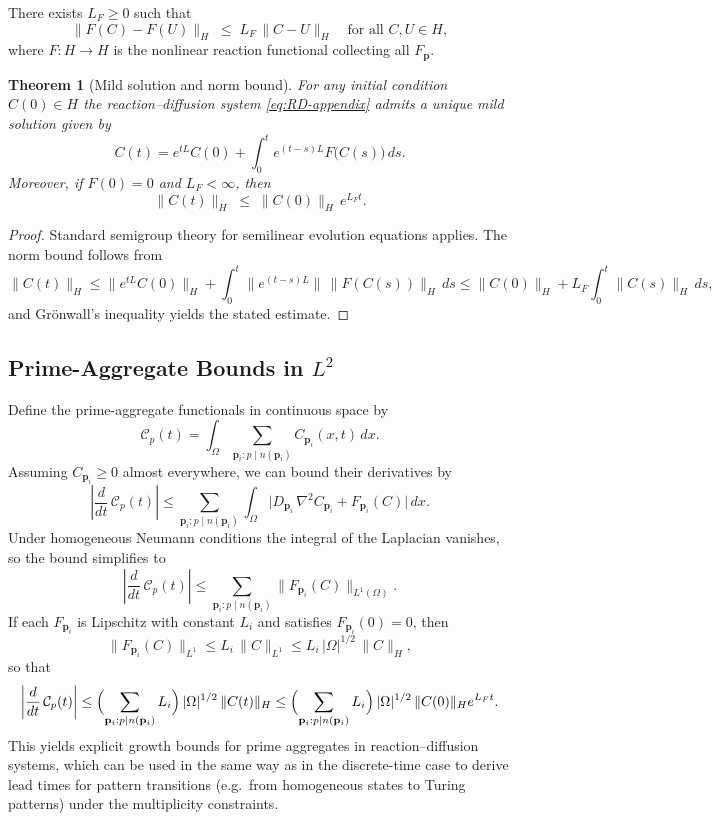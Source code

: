 \documentclass[12pt,letterpaper]{article}
\newtheorem{theorem}{Theorem}[section]
\newcommand{\bp}{\mathbf{p}}
\begin{document}
\begin{assumption}
There exists $L_F \ge 0$ such that
\[
  \|F(C) - F(U)\|_H \;\leq\; L_F\,\|C-U\|_H
  \quad\text{for all }C,U \in H,
\]
where $F: H \to H$ is the nonlinear reaction functional collecting all
$F_{\bp}$.
\end{assumption}

\begin{theorem}[Mild solution and norm bound]
For any initial condition $C(0) \in H$ the reaction--diffusion system
\eqref{eq:RD-appendix} admits a unique mild solution given by
\[
  C(t) = e^{tL} C(0)
  + \int_0^t e^{(t-s)L} F\bigl(C(s)\bigr)\,ds.
\]
Moreover, if $F(0)=0$ and $L_F < \infty$, then
\[
  \|C(t)\|_H \;\leq\; \|C(0)\|_H\,e^{L_F t}.
\]
\end{theorem}

\begin{proof}
Standard semigroup theory for semilinear evolution equations applies. The
norm bound follows from
\[
  \|C(t)\|_H
  \le \|e^{tL} C(0)\|_H + \int_0^t \|e^{(t-s)L}\|\,\|F(C(s))\|_H\,ds
  \le \|C(0)\|_H + L_F \int_0^t \|C(s)\|_H\,ds,
\]
and Grönwall's inequality yields the stated estimate.
\end{proof}

\subsection{Prime-Aggregate Bounds in $L^2$}

Define the prime-aggregate functionals in continuous space by
\[
  \mathcal{C}_p(t)
  = \int_\Omega \sum_{\bp_i: p\mid n(\bp_i)} C_{\bp_i}(x,t)\,dx.
\]
Assuming $C_{\bp_i} \ge 0$ almost everywhere, we can bound their derivatives
by
\[
  \left|\frac{d}{dt}\,\mathcal{C}_p(t)\right|
  \le \sum_{\bp_i: p\mid n(\bp_i)}
    \int_\Omega \bigl| D_{\bp_i}\,\nabla^2 C_{\bp_i}
                     + F_{\bp_i}(C)\bigr|\,dx.
\]
Under homogeneous Neumann conditions the integral of the Laplacian vanishes,
so the bound simplifies to
\[
  \left|\frac{d}{dt}\,\mathcal{C}_p(t)\right|
  \le \sum_{\bp_i: p\mid n(\bp_i)} \|F_{\bp_i}(C)\|_{L^1(\Omega)}.
\]
If each $F_{\bp_i}$ is Lipschitz with constant $L_i$ and satisfies
$F_{\bp_i}(0)=0$, then
\[
  \|F_{\bp_i}(C)\|_{L^1}
  \le L_i\,\|C\|_{L^1} \le L_i\,|\Omega|^{1/2}\,\|C\|_H,
\]
so that
\[
  \left|\frac{d}{dt}\,\mathcal{C}_p(t)\right|
  \le \Bigl(\sum_{\bp_i: p\mid n(\bp_i)} L_i\Bigr)\,|\Omega|^{1/2}\,\|C(t)\|_H
  \le \Bigl(\sum_{\bp_i: p\mid n(\bp_i)} L_i\Bigr)\,|\Omega|^{1/2}\,\|C(0)\|_H e^{L_F t}.
\]
This yields explicit growth bounds for prime aggregates in reaction--diffusion
systems, which can be used in the same way as in the discrete-time case to
derive lead times for pattern transitions (e.g.\ from homogeneous states to
Turing patterns) under the multiplicity constraints.
\end{document}
